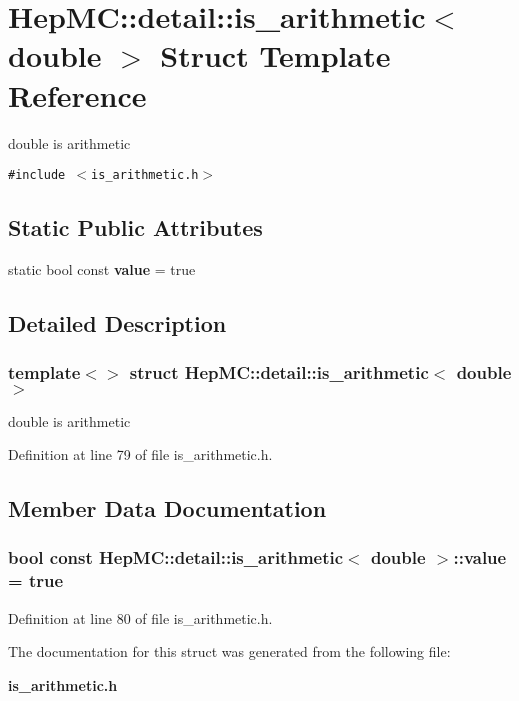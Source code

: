 \section{Hep\-MC::detail::is\_\-arithmetic$<$ double $>$ Struct Template Reference}
\label{structHepMC_1_1detail_1_1is__arithmetic_3_01double_01_4}
double is arithmetic  


{\tt \#include $<$is\_\-arithmetic.h$>$}

\subsection*{Static Public Attributes}
\begin{CompactItemize}
\item 
static bool const {\bf value} = true
\end{CompactItemize}


\subsection{Detailed Description}
\subsubsection*{template$<$$>$ struct Hep\-MC::detail::is\_\-arithmetic$<$ double $>$}

double is arithmetic 



Definition at line 79 of file is\_\-arithmetic.h.

\subsection{Member Data Documentation}
\subsubsection{\setlength{\rightskip}{0pt plus 5cm}bool const {\bf Hep\-MC::detail::is\_\-arithmetic}$<$ double $>$::{\bf value} = true\hspace{0.3cm}{\tt  [static]}}\label{structHepMC_1_1detail_1_1is__arithmetic_3_01double_01_4_a795bfdda0c19f00643eedc84f3b0fe0}




Definition at line 80 of file is\_\-arithmetic.h.

The documentation for this struct was generated from the following file:\begin{CompactItemize}
\item 
{\bf is\_\-arithmetic.h}\end{CompactItemize}
